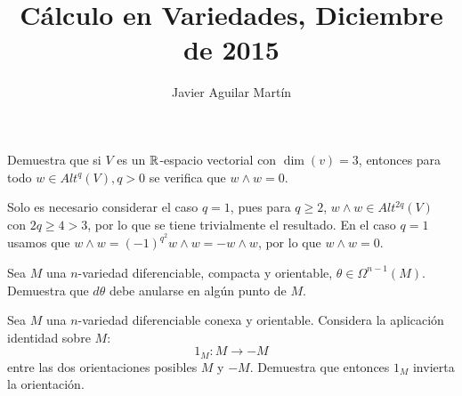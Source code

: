 \documentclass[twoside]{article}
\begin{document}
\title{Cálculo en Variedades, Diciembre de 2015}
\author{Javier Aguilar Martín}
\maketitle


\begin{ejercicio}{1}
Demuestra que si $V$ es un $\mathbb{R}$-espacio vectorial con $\dim(v)=3$, entonces para todo $w\in Alt^q(V), q>0$ se verifica que $w\land w=0$.
\end{ejercicio}
\begin{solucion}
Solo es necesario considerar el caso $q=1$, pues para $q\geq 2$, $w\land w\in Alt^{2q}(V)$ con $2q\geq 4>3$, por lo que se tiene trivialmente el resultado. En el caso $q=1$ usamos que $w\land w=(-1)^{q^2}w\land w=-w\land w$, por lo que $w\land w=0$.


\end{solucion}

\newpage

\begin{ejercicio}{2}
Sea $M$ una $n$-variedad diferenciable, compacta y orientable, $\theta\in\Omega^{n-1}(M)$. Demuestra que $d\theta$ debe anularse en algún punto de $M$.
\end{ejercicio}
\begin{solucion}

\end{solucion}
\newpage

\begin{ejercicio}{3}
Sea $M$ una $n$-variedad diferenciable conexa y orientable. Considera la aplicación identidad sobre $M$:
\[
1_M:M\to -M
\]
entre las dos orientaciones posibles $M$ y $-M$. Demuestra que entonces $1_M$ invierta la orientación.
\end{ejercicio}
\begin{solucion}

\end{solucion}
\newpage

\begin{ejercicio}{4}

\end{ejercicio}
\begin{solucion}

\end{solucion}
\end{document}
